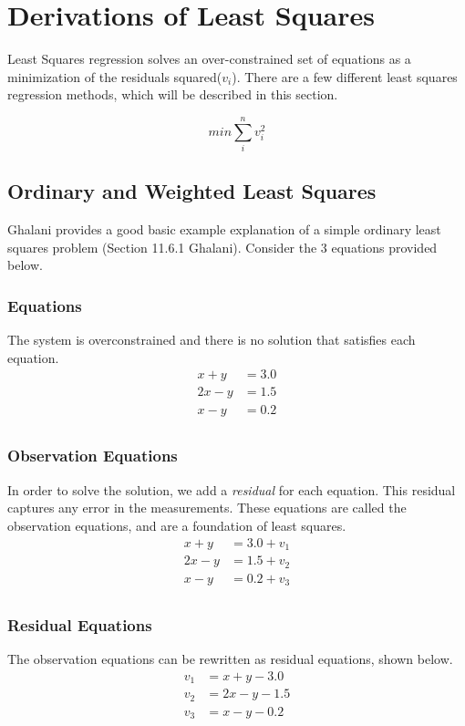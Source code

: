 \section{Derivations of Least Squares}
Least Squares regression solves an over-constrained set of equations as a minimization of the residuals squared($v_i$).  There are a few different least squares regression methods, which will be described in this section.

\[
min \sum_{i}^{n} v_i^2
\]

\subsection{Ordinary and Weighted Least Squares}
Ghalani provides a good basic example explanation of a simple ordinary least squares problem (Section 11.6.1 Ghalani). Consider the 3 equations provided below.  

\subsubsection*{Equations}
The system is overconstrained and there is no solution that satisfies each equation.
\begin{align*}
x+y &= 3.0 \\
2x-y &= 1.5 \\
x-y &= 0.2 \\
\end{align*}

\subsubsection*{Observation Equations}
In order to solve the solution, we add a \textit{residual} for each equation.  This residual captures any error in the measurements.  These equations are called the observation equations, and are a foundation of least squares.
\begin{align*}
x+y &= 3.0 + v_1\\
2x-y &= 1.5 + v_2\\
x-y &= 0.2 + v_3\\
\end{align*}

\subsubsection*{Residual Equations}
The observation equations can be rewritten as residual equations, shown below.	
\begin{align*}
v_1 &= x + y - 3.0 \\
v_2 &= 2x - y - 1.5 \\
v_3 &= x - y - 0.2 \\
\end{align*}

